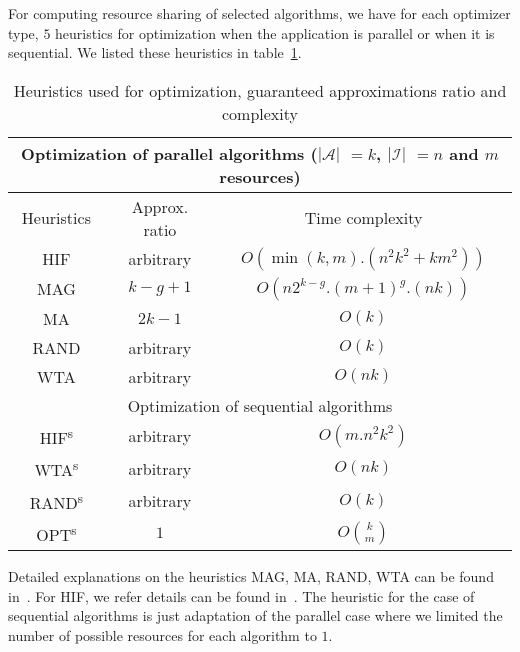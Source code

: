For computing resource sharing of selected algorithms, we have for each optimizer type, $5$ heuristics 
for optimization when the application is parallel or when it is sequential. We listed these heuristics 
in table~\ref{tabHeuristics}.
\begin{table}[htb]
\begin{center}
\begin{tabular}{ccc}
\hline
\multicolumn{3}{c}{\small Optimization of parallel algorithms ($|\mathcal{A}|$ $= k$, $|\mathcal{I}|$ $= n$ 
and $m$ resources)} \\
\hline
{\small Heuristics } & {\small Approx. ratio} & {\small Time complexity}  \\\hline
{\small HIF}     & {\small arbitrary}   & {\small $O( \min(k,m).(n^2k^2 + km^2))$}   \\ %
{\small MAG}     & {\small $k-g+1$}   & {\small $O(n2^{k-g}.(m+1)^g.(nk) )$}   \\ %
{\small MA}     & {\small $2k-1$}   & {\small $O(k)$}   \\ %
{\small RAND}     & {\small arbitrary}   & {\small $O(k)$}  \\ %
{\small WTA}     & {\small arbitrary}   &  {\small $O(nk)$}  \\\hline
\multicolumn{3}{c}{\small Optimization of sequential algorithms}\\
\hline
{\small HIF\textsuperscript{s}}     & {\small arbitrary}   & {\small $O( m.n^2k^2 )$}   \\ %
{\small WTA\textsuperscript{s}}     & {\small arbitrary}   &  {\small $O(nk)$}  \\ %
{\small RAND\textsuperscript{s}}     & {\small arbitrary}   & {\small $O(k)$}  \\ %
{\small OPT\textsuperscript{s}}     & {\small $1$}   & {\small $O {k \choose m}$}  \\\hline
\end{tabular} 
\caption{Heuristics used for optimization, guaranteed approximations ratio and complexity  }
\label{tabHeuristics}
\end{center}
\end{table}
Detailed explanations on the heuristics MAG, MA, RAND, WTA can be found in~\cite{APDCM}. For HIF, we 
refer details can be found in~\cite{RRJEA}. The heuristic for the case of sequential algorithms is  just 
adaptation of the parallel case where we limited the number of possible resources for each algorithm to $1$. 


